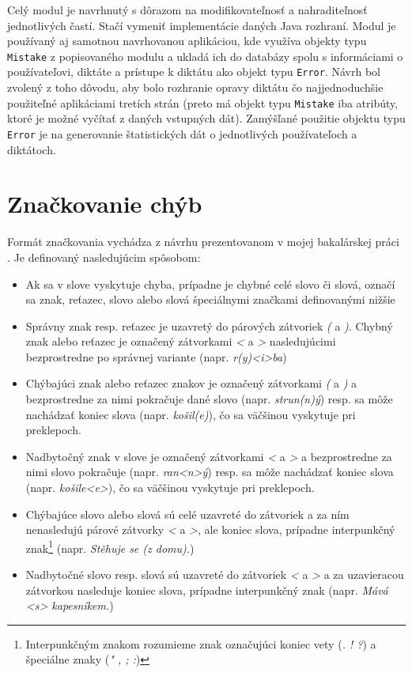 \documentclass[12pt,oneside]{fithesis2}
\begin{document}
      \par Celý modul je navrhnutý s dôrazom na modifikovateľnosť a nahraditeľnosť jednotlivých častí. Stačí vymeniť implementácie daných Java rozhraní. Modul je používaný aj samotnou navrhovanou aplikáciou, kde využíva objekty typu \texttt{Mistake} z popisovaného modulu a ukladá ich do databázy spolu s informáciami o používateľovi, diktáte a prístupe k diktátu ako objekt typu \texttt{Error}. Návrh bol zvolený z toho dôvodu, aby bolo rozhranie opravy diktátu čo najjednoduchšie použiteľné aplikáciami tretích strán (preto má objekt typu \texttt{Mistake} iba atribúty, ktoré je možné vyčítať z daných vstupných dát). Zamýšľané použitie objektu typu \texttt{Error} je na generovanie štatistických dát o jednotlivých používateľoch a diktátoch.
      
      \section{Značkovanie chýb}
      \par Formát značkovania vychádza z návrhu prezentovanom v mojej bakalárskej práci \cite{rumanov12}. Je definovaný nasledujúcim spôsobom:
      \begin{itemize}
	\item Ak sa v slove vyskytuje chyba, prípadne je chybné celé slovo či slová, označí sa znak, reťazec, slovo alebo slová špeciálnymi značkami definovanými nižšie
	\item Správny znak resp. reťazec je uzavretý do párových zátvoriek \textit{(} a \textit{)}. Chybný znak alebo reťazec je označený zátvorkami \textit{<} a \textit{>} nasledujúcimi bezprostredne po správnej variante (napr. \textit{r(y)<i>ba})
	\item Chýbajúci znak alebo reťazec znakov je označený zátvorkami \textit{(} a \textit{)} a bezprostredne za nimi pokračuje dané slovo (napr. \textit{strun(n)ý}) resp. sa môže nachádzať koniec slova (napr. \textit{košil(e)}), čo sa väčšinou vyskytuje pri preklepoch.
	\item Nadbytočný znak v slove je označený zátvorkami \textit{<} a \textit{>} a bezprostredne za nimi slovo pokračuje (napr. \textit{ran<n>ý}) resp. sa môže nachádzať koniec slova (napr. \textit{košile<e>}), čo sa väčšinou vyskytuje pri preklepoch.
	\item Chýbajúce slovo alebo slová sú celé uzavreté do zátvoriek a za ním nenasledujú párové zátvorky \textit{<} a \textit{>}, ale koniec slova, prípadne interpunkčný znak\footnote{Interpunkčným znakom rozumieme znak označujúci koniec vety (\textit{. ! ?}) a špeciálne znaky (\textit{" , ; :})} (napr. \textit{Stěhuje se (z domu).})
	\item Nadbytočné slovo resp. slová sú uzavreté do zátvoriek \textit{<} a \textit{>} a za uzavieracou zátvorkou nasleduje koniec slova, prípadne interpunkčný znak (napr. \textit{Mává <s> kapesníkem.})
	\end{itemize}
\end{document}
